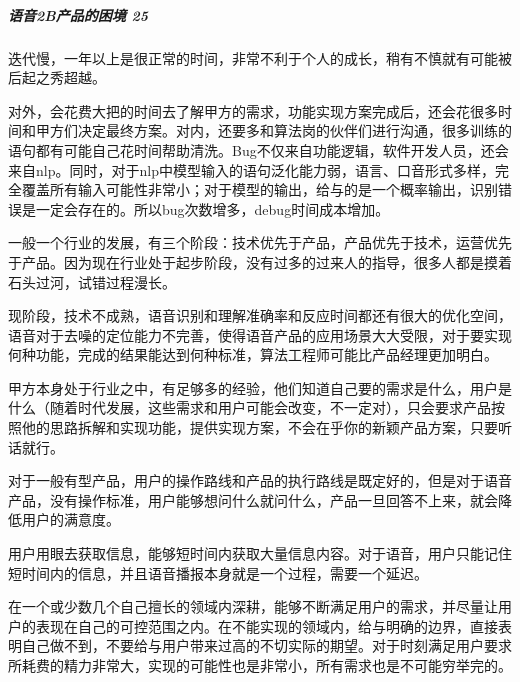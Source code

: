 \documentclass[letterpaper,10pt,english]{sphinxmanual}
\begin{document}
\subparagraph{语音2B产品的困境 25\sphinxfootnotemark[94]}
\label{\detokenize{chapter_introduction/2B:b-25}}%
\begin{footnotetext}[94]\sphinxAtStartFootnote
{}
%
\end{footnotetext}\ignorespaces 
{}
迭代慢，一年以上是很正常的时间，非常不利于个人的成长，稍有不慎就有可能被后起之秀超越。

对外，会花费大把的时间去了解甲方的需求，功能实现方案完成后，还会花很多时间和甲方们决定最终方案。对内，还要多和算法岗的伙伴们进行沟通，很多训练的语句都有可能自己花时间帮助清洗。Bug不仅来自功能逻辑，软件开发人员，还会来自nlp。同时，对于nlp中模型输入的语句泛化能力弱，语言、口音形式多样，完全覆盖所有输入可能性非常小；对于模型的输出，给与的是一个概率输出，识别错误是一定会存在的。所以bug次数增多，debug时间成本增加。

一般一个行业的发展，有三个阶段：技术优先于产品，产品优先于技术，运营优先于产品。因为现在行业处于起步阶段，没有过多的过来人的指导，很多人都是摸着石头过河，试错过程漫长。

现阶段，技术不成熟，语音识别和理解准确率和反应时间都还有很大的优化空间，语音对于去噪的定位能力不完善，使得语音产品的应用场景大大受限，对于要实现何种功能，完成的结果能达到何种标准，算法工程师可能比产品经理更加明白。

甲方本身处于行业之中，有足够多的经验，他们知道自己要的需求是什么，用户是什么（随着时代发展，这些需求和用户可能会改变，不一定对），只会要求产品按照他的思路拆解和实现功能，提供实现方案，不会在乎你的新颖产品方案，只要听话就行。

对于一般有型产品，用户的操作路线和产品的执行路线是既定好的，但是对于语音产品，没有操作标准，用户能够想问什么就问什么，产品一旦回答不上来，就会降低用户的满意度。

用户用眼去获取信息，能够短时间内获取大量信息内容。对于语音，用户只能记住短时间内的信息，并且语音播报本身就是一个过程，需要一个延迟。


在一个或少数几个自己擅长的领域内深耕，能够不断满足用户的需求，并尽量让用户的表现在自己的可控范围之内。在不能实现的领域内，给与明确的边界，直接表明自己做不到，不要给与用户带来过高的不切实际的期望。对于时刻满足用户要求所耗费的精力非常大，实现的可能性也是非常小，所有需求也是不可能穷举完的。
\end{document}
